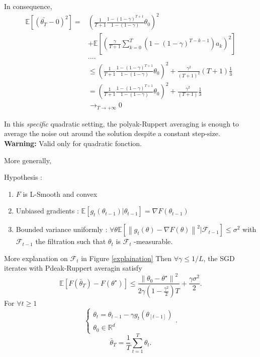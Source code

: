 In consequence,
\begin{align*}
    \mathbb{E} [(\bar{\theta _T} - 0)^2] = &(\frac{1}{T+1} \frac{1 - (1- \gamma )^{T+1}}{1 - (1- \gamma )} \theta _0)^2 \\
    & + \mathbb{E} [(\frac{\gamma }{T+1} \sum_{k=0}^{T}(1 - (1- \gamma )^{T-k-1}) a_k)^2] \\
    & .... \\
    & \leq (\frac{1}{T+1} \frac{1 - (1- \gamma )^{T+1}}{1 - (1- \gamma )} \theta _0)^2 + \frac{\gamma ^2}{(T+1)^2} (T+1) \frac{1}{3} \\
    & = (\frac{1}{T+1} \frac{1 - (1- \gamma )^{T+1}}{1 - (1- \gamma )} \theta _0)^2 + \frac{\gamma ^2}{(T+1)} \frac{1}{3} \\
    & \to_{T \to +\infty} 0 
\end{align*}

In this \textit{specific} quadratic setting, the polyak-Ruppert averaging is enough to average the noise out around the solution despite a constant step-size. \\
\textbf{Warning:} Valid only for quadratic fonction.

More generally, 
\begin{thm}[]
    Hypothesis :
    \begin{enumerate}
        \item $ F $ is L-Smooth and convex
        \item Unbiased gradients : $ \mathbb{E}[g_t (\theta _{t-1} ) | \theta _{t-1} ] = \nabla F(\theta _{t-1}) $ 
        \item Bounded variance uniformly : $ \forall \theta  \mathbb{E}[ \left\| g_t(\theta ) - \nabla F(\theta ) \right\| ^2 | \mathcal{F}_{t-1}] \leq \sigma ^2 $ with $ \mathcal{F}_{t-1} $ the filtration such that $ \theta _t $ is $ \mathcal{F}_t $ -measurable.
    \end{enumerate}
    More explanation on $ \mathcal{F}_t $ in Figure \ref{explaination}
    Then $ \forall \gamma \leq 1/L $, the SGD iterates with Pdeak-Ruppert averagin satisfy 
    \[
        \mathbb{E}[F(\bar{\theta }_T) - F (\theta ^\star )] \leq \frac{\left\| \theta _0 - \theta ^\star  \right\|  ^2}{ 2 \gamma ( 1 - \frac{\gamma ^2}{2} ) T } + \frac{\gamma  \sigma ^2}{2}
        .\]
        For $ \forall t \geq 1 $ 
        \[
            \begin{cases}
                \theta _t = \theta _{t-1} - \gamma g_t(\theta _[t-1]) \\
                \theta _0 \in \mathbb{R}^d
            \end{cases} 
            .\]
            \[
                \bar{\theta }_T = \frac{1}{T} \sum_{t=1}^{T} \theta _t
                .\]
\end{thm}
            
